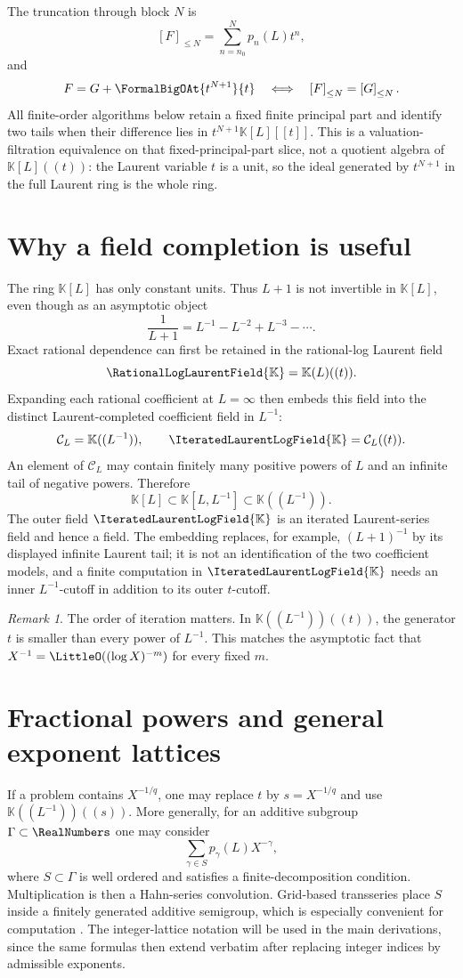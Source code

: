 \documentclass[11pt,oneside]{book}
\theoremstyle{definition}
\theoremstyle{remark}
\newtheorem{remark}[theorem]{Remark}
\newcommand{\K}{\mathbb K}
\newcommand{\PLfield}{\IteratedLaurentLogField{\K}}
\newcommand{\trunc}[2]{\left[#1\right]_{\le #2}}
\begin{document}
The truncation through block $N$ is
\[
 \trunc{F}{N}=\sum_{n=n_0}^{N}p_n(L)t^n,
\]
and
\[
 F=G+\FormalBigOAt{t^{N+1}}{t}
 \quad\Longleftrightarrow\quad
 \trunc{F}{N}=\trunc{G}{N}.
\]
All finite-order algorithms below retain a fixed finite principal part and identify
two tails when their difference lies in
\(t^{N+1}\K[L][[t]]\).  This is a valuation-filtration equivalence on that
fixed-principal-part slice, not a quotient algebra of \(\K[L]((t))\): the Laurent
variable \(t\) is a unit, so the ideal generated by \(t^{N+1}\) in the full Laurent
ring is the whole ring.

\section{Why a field completion is useful}
The ring $\K[L]$ has only constant units.  Thus $L+1$ is not invertible in
$\K[L]$, even though as an asymptotic object
\[
 \frac{1}{L+1}=L^{-1}-L^{-2}+L^{-3}-\cdots.
\]
Exact rational dependence can first be retained in the rational-log Laurent
field
\[
 \RationalLogLaurentField{\K}=\K(L)((t)).
\]
Expanding each rational coefficient at \(L=\infty\) then embeds this field into
the distinct Laurent-completed coefficient field in \(L^{-1}\):
\begin{equation}\label{eq:PL-field-def}
 \mathcal C_L=\K((L^{-1})),
 \qquad
 \PLfield=\mathcal C_L((t)).
\end{equation}
An element of $\mathcal C_L$ may contain finitely many positive powers of $L$
and an infinite tail of negative powers.  Therefore
\[
 \K[L]\subset\K[L,L^{-1}]\subset\K((L^{-1})).
\]
The outer field $\PLfield$ is an iterated Laurent-series field and hence a
field.  The embedding replaces, for example, \((L+1)^{-1}\) by its displayed
infinite Laurent tail; it is not an identification of the two coefficient
models, and a finite computation in \(\PLfield\) needs an inner
\(L^{-1}\)-cutoff in addition to its outer \(t\)-cutoff.

\begin{remark}
The order of iteration matters.  In $\K((L^{-1}))((t))$, the generator $t$ is
smaller than every power of $L^{-1}$.  This matches the asymptotic fact that
$X^{-1}=\LittleO((\log X)^{-m})$ for every fixed $m$.
\end{remark}

\section{Fractional powers and general exponent lattices}
If a problem contains $X^{-1/q}$, one may replace $t$ by $s=X^{-1/q}$ and use
$\K((L^{-1}))((s))$.  More generally, for an additive subgroup
$\Gamma\subset\RealNumbers$ one may consider
\[
 \sum_{\gamma\in S}p_\gamma(L)X^{-\gamma},
\]
where $S\subset\Gamma$ is well ordered and satisfies a finite-decomposition
condition.  Multiplication is then a Hahn-series convolution.  Grid-based
transseries place $S$ inside a finitely generated additive semigroup, which is
especially convenient for computation \cite{EdgarBeginners,EdgarComposition}.
The integer-lattice notation will be used in the main derivations, since the
same formulas then extend verbatim after replacing integer indices by
admissible exponents.
\end{document}
